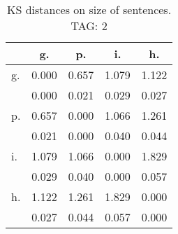 \begin{table}[h!]
\begin{center}
\begin{tabular}{| l | c | c | c | c |}\hline
 & g. & p. & i. & h. \\\hline
g. & 0.000  & 0.657  & 1.079  & 1.122 \\\hline
 & 0.000  & 0.021  & 0.029  & 0.027 \\\hline
p. & 0.657  & 0.000  & 1.066  & 1.261 \\\hline
 & 0.021  & 0.000  & 0.040  & 0.044 \\\hline
i. & 1.079  & 1.066  & 0.000  & 1.829 \\\hline
 & 0.029  & 0.040  & 0.000  & 0.057 \\\hline
h. & 1.122  & 1.261  & 1.829  & 0.000 \\\hline
 & 0.027  & 0.044  & 0.057  & 0.000 \\\hline
\end{tabular}
\caption{KS distances on size of sentences. TAG: 2}
\end{center}
\end{table}